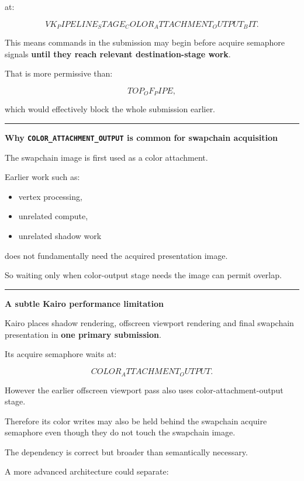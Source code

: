 at:

\[
VK_PIPELINE_STAGE_COLOR_ATTACHMENT_OUTPUT_BIT.
\]

This means commands in the submission may begin before acquire semaphore signals \textbf{until they reach relevant destination-stage work}.

That is more permissive than:

\[
TOP_OF_PIPE,
\]

which would effectively block the whole submission earlier.

\begin{center}\rule{0.5\linewidth}{0.5pt}\end{center}

\textbf{Why \texttt{COLOR\_ATTACHMENT\_OUTPUT} is common for swapchain acquisition}

The swapchain image is first used as a color attachment.

Earlier work such as:

\begin{itemize}
\tightlist
\item
  vertex processing,
\item
  unrelated compute,
\item
  unrelated shadow work
\end{itemize}

does not fundamentally need the acquired presentation image.

So waiting only when color-output stage needs the image can permit overlap.

\begin{center}\rule{0.5\linewidth}{0.5pt}\end{center}

\textbf{A subtle Kairo performance limitation}

Kairo places shadow rendering, offscreen viewport rendering and final swapchain presentation in \textbf{one primary submission}.

Its acquire semaphore waits at:

\[
COLOR_ATTACHMENT_OUTPUT.
\]

However the earlier offscreen viewport pass also uses color-attachment-output stage.

Therefore its color writes may also be held behind the swapchain acquire semaphore even though they do not touch the swapchain image.

The dependency is correct but broader than semantically necessary.

A more advanced architecture could separate:

